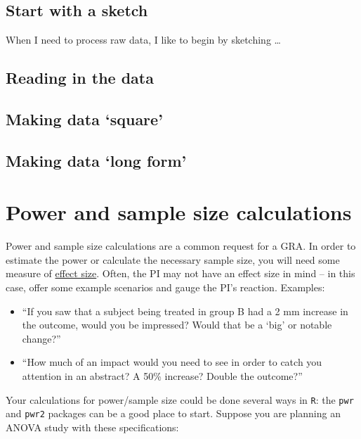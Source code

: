 \documentclass[
]{book}
\providecommand{\tightlist}{%
  \setlength{\itemsep}{0pt}\setlength{\parskip}{0pt}}
\begin{document}
\hypertarget{start-with-a-sketch}{%
\section{Start with a sketch}\label{start-with-a-sketch}}

When I need to process raw data, I like to begin by sketching \ldots{}

\hypertarget{reading-in-the-data}{%
\section{Reading in the data}\label{reading-in-the-data}}

\hypertarget{making-data-square}{%
\section{Making data `square'}\label{making-data-square}}

\hypertarget{making-data-long-form}{%
\section{Making data `long form'}\label{making-data-long-form}}

\hypertarget{power-and-sample-size-calculations}{%
\chapter{Power and sample size calculations}\label{power-and-sample-size-calculations}}

Power and sample size calculations are a common request for a GRA. In order to estimate the power or calculate the necessary sample size, you will need some measure of \href{https://en.wikipedia.org/wiki/Effect_size}{effect size}. Often, the PI may not have an effect size in mind -- in this case, offer some example scenarios and gauge the PI's reaction. Examples:

\begin{itemize}
\tightlist
\item
  ``If you saw that a subject being treated in group B had a 2 mm increase in the outcome, would you be impressed? Would that be a `big' or notable change?''
\item
  ``How much of an impact would you need to see in order to catch you attention in an abstract? A 50\% increase? Double the outcome?''
\end{itemize}

Your calculations for power/sample size could be done several ways in \texttt{R}: the \texttt{pwr} and \texttt{pwr2} packages can be a good place to start. Suppose you are planning an ANOVA study with these specifications:
\end{document}
